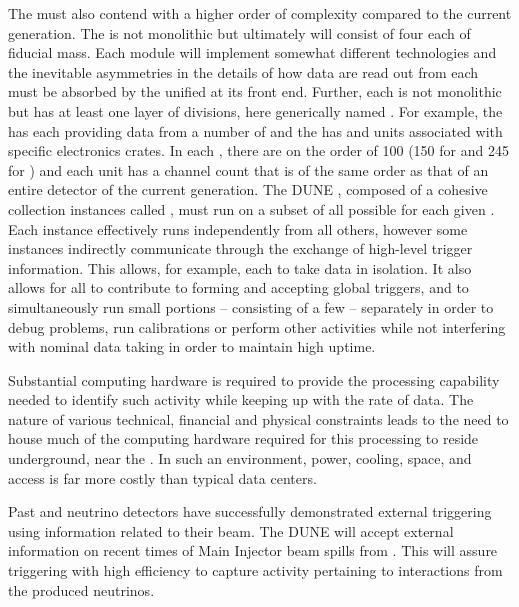 The %
 must also contend with a higher order of
complexity compared to the current generation. 
The  is not monolithic but ultimately will consist
of four  each of \nominalmodsize fiducial mass. 
Each module will %
implement somewhat different %
technologies and the
inevitable asymmetries in the details of how data are read out from
each must be absorbed by the unified  at its front end. 
Further, each  is not monolithic but has at least one
layer of divisions, here generically named . 
For example, the  has  each
providing data from a number of  and the  has
 and  units associated with specific electronics
crates.
In each , there are on the order of \num{100} 
(\num{150} for  and \num{245} for ) and each unit has a
channel count that is of the same order as that of an entire \lartpc
detector of the current generation.
The DUNE , composed of a cohesive collection  instances
called
, must run on a subset of all possible
 for each given . 
Each instance effectively runs independently from all others, however
some instances indirectly communicate through the exchange of
high-level trigger information. 
This allows, for example, each  to take data in
isolation. It also allows for all  to contribute to forming and
accepting global  triggers, and to simultaneously run small portions -- consisting of a few  -- separately in
order to debug problems, run calibrations or %
 perform other activities while not interfering with nominal data taking in order to maintain high uptime.

Substantial computing hardware is required to provide the processing
capability needed to identify such activity while keeping up with the
rate of data.
The nature of various technical, financial and physical constraints
leads to the need to house much of the computing hardware %
required for this processing
to reside underground, near the . 
In such an environment, power, cooling, space, and access is far more
costly than typical data centers. %

Past \lartpc and  neutrino detectors have successfully
demonstrated external triggering using information related to their beam. 
The DUNE   will accept external information on recent
times of Main Injector beam spills from \fnal. 
This will assure triggering with high efficiency to capture activity
pertaining to interactions from the produced neutrinos. 

